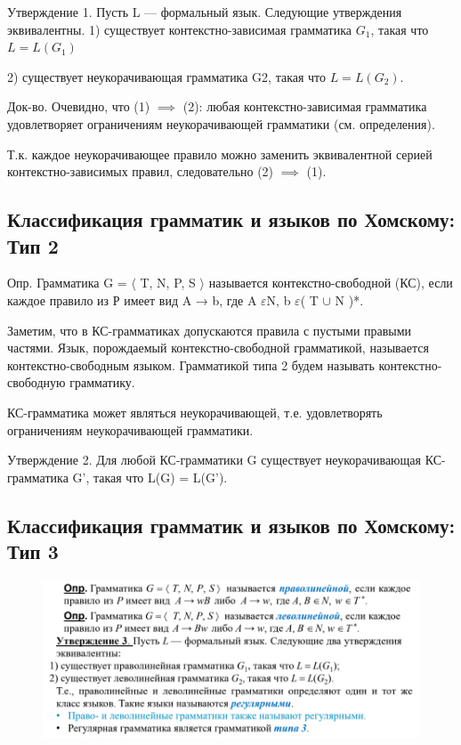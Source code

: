 \documentclass{article}
\begin{document}
Утверждение 1. Пусть L — формальный язык. Следующие утверждения
эквивалентны.
1) существует контекстно-зависимая грамматика $G_1$, такая что $L = L(G_1)$

2) существует неукорачивающая грамматика G2, такая что $L = L(G_2).$

Док-во. Очевидно, что (1) $\implies$ (2): любая контекстно-зависимая грамматика удовлетворяет ограничениям неукорачивающей грамматики (см. определения).

Т.к. каждое неукорачивающее правило можно заменить эквивалентной
серией контекстно-зависимых правил, следовательно (2) $\implies$ (1).

\subsection{Классификация грамматик и языков по
Хомскому: Тип 2}

Опр. Грамматика G = $\langle$ T, N, P, S $\rangle$ называется контекстно-свободной (КС),
если каждое правило из Р имеет вид A → b, где A $\varepsilon$N, b $\varepsilon$( T $\cup$ N )*.

Заметим, что в КС-грамматиках допускаются правила с пустыми правыми
частями. Язык, порождаемый контекстно-свободной грамматикой,
называется контекстно-свободным языком.
Грамматикой типа 2 будем называть контекстно-свободную грамматику.

КС-грамматика может являться неукорачивающей, т.е. удовлетворять
ограничениям неукорачивающей грамматики.

Утверждение 2. Для любой КС-грамматики G существует
неукорачивающая КС- грамматика G', такая что L(G) = L(G').

\subsection{Классификация грамматик и языков по
Хомскому: Тип 3}


\begin{figure}[H]
    \centering
    \includegraphics[width=1\linewidth]{Снимок экрана 2025-02-20 094134.png}
\end{figure}
\end{document}
